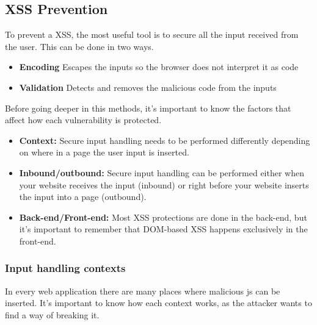
\subsection{XSS Prevention}
To prevent a XSS, the most useful tool is to secure all the input received from the user. This can be done in two ways.
\begin{itemize}
	\item\textbf{Encoding} Escapes the inputs so the browser does not interpret it as code
	\item\textbf{Validation} Detects and removes the malicious code from the inputs
\end{itemize}
Before going deeper in this methods, it's important to know the factors that affect how each vulnerability is protected.
\begin{itemize}
	\item \textbf{Context:} Secure input handling needs to be performed differently depending on where in a page the user input is inserted.
	\item \textbf{Inbound/outbound:} Secure input handling can be performed either when your website receives the input (inbound) or right before your website inserts the input into a page (outbound).
	\item \textbf{Back-end/Front-end:} Most XSS protections are done in the back-end, but it's important to remember that DOM-based XSS happens exclusively in the front-end.
\end{itemize}

\subsubsection{Input handling contexts}
In every web application there are many places where malicious js can be inserted. It's important to know how each context works, as the attacker wants to find a way of breaking it.

